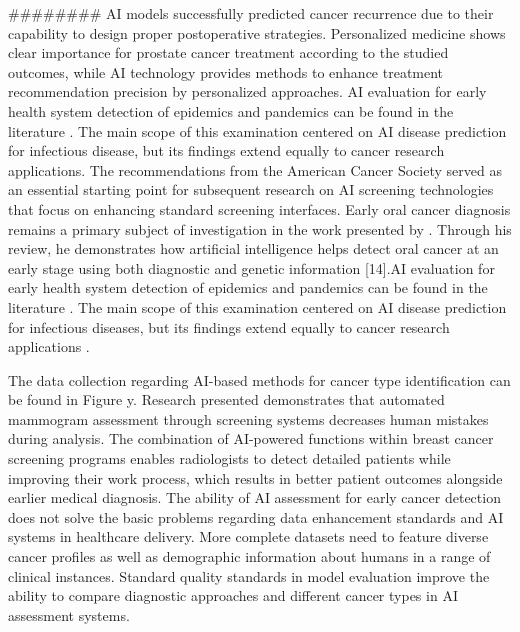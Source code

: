 \documentclass[conference]{IEEEtran}
\begin{document}
########
AI models successfully predicted cancer recurrence due to their capability to design proper postoperative strategies. Personalized medicine shows clear importance for prostate cancer treatment according to the studied outcomes, while AI technology provides methods to enhance treatment recommendation precision by personalized approaches. AI evaluation for early health system detection of epidemics and pandemics can be found in the literature . The main scope of this examination centered on AI disease prediction for infectious disease, but its findings extend equally to cancer research applications. 
 The recommendations from the American Cancer Society served as an essential starting point for subsequent research on AI screening technologies that focus on enhancing standard screening interfaces. Early oral cancer diagnosis remains a primary subject of investigation in the work presented by . Through his review, he demonstrates how artificial intelligence helps detect oral cancer at an early stage using both diagnostic and genetic information [14].AI evaluation for early health system detection of epidemics and pandemics can be found in the literature . The main scope of this examination centered on AI disease prediction for infectious diseases, but its findings extend equally to cancer research applications . 



The data collection regarding AI-based methods for cancer type identification can be found in Figure y.
Research presented  demonstrates that automated mammogram assessment through screening systems decreases human mistakes during analysis. The combination of AI-powered functions within breast cancer screening programs enables radiologists to detect detailed patients while improving their work process, which results in better patient outcomes alongside earlier medical diagnosis.
The ability of AI assessment for early cancer detection does not solve the basic problems regarding data enhancement standards and AI systems in healthcare delivery. More complete datasets need to feature diverse cancer profiles as well as demographic information about humans in a range of clinical instances. Standard quality standards in model evaluation improve the ability to compare diagnostic approaches and different cancer types in AI assessment systems.
\end{document}

